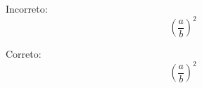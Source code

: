 \documentclass[a4paper,12pt]{article}
\begin{document}
	Incorreto:
	\[
		( \frac{a}{b} )^2
	\]
		
	Correto:
	\[
		\left( \frac{a}{b} \right)^2
	\]
\end{document}
